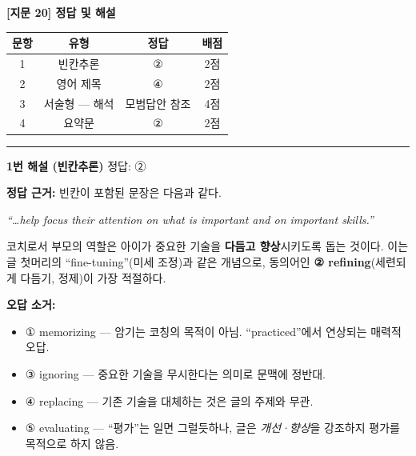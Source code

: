 \documentclass[11pt,a4paper]{article}
\begin{document}
\begin{center}
{\fontsize{15}{17}\selectfont\sffamily\bfseries [지문 20] 정답 및 해설}
\end{center}
\vspace{8pt}

\begin{center}
\begin{tabular}{|c|c|c|c|}
\hline
\textbf{문항} & \textbf{유형} & \textbf{정답} & \textbf{배점} \\
\hline
1 & 빈칸추론 & ② & 2점 \\
\hline
2 & 영어 제목 & ④ & 2점 \\
\hline
3 & 서술형 — 해석 & 모범답안 참조 & 4점 \\
\hline
4 & 요약문 & ② & 2점 \\
\hline
\end{tabular}
\end{center}

\vspace{12pt}
\hrule
\vspace{10pt}

{\sffamily\bfseries 1번 해설 (빈칸추론)} \hfill {\small 정답: ②}

\vspace{4pt}
\textbf{정답 근거:} 빈칸이 포함된 문장은 다음과 같다.

\begin{pbox}
\itshape
``\ldots help focus their attention on what is important and on \underline{\hspace{2.5cm}} important skills.''
\end{pbox}

\vspace{4pt}
코치로서 부모의 역할은 아이가 중요한 기술을 \textbf{다듬고 향상}시키도록 돕는 것이다.
이는 글 첫머리의 ``fine-tuning''(미세 조정)과 같은 개념으로, 동의어인 \textbf{② refining}(세련되게
다듬기, 정제)이 가장 적절하다.

\vspace{6pt}
\textbf{오답 소거:}
\begin{itemize}[leftmargin=2em,itemsep=1pt]
  \item ① memorizing — 암기는 코칭의 목적이 아님. ``practiced''에서 연상되는 매력적 오답.
  \item ③ ignoring — 중요한 기술을 무시한다는 의미로 문맥에 정반대.
  \item ④ replacing — 기존 기술을 대체하는 것은 글의 주제와 무관.
  \item ⑤ evaluating — ``평가''는 일면 그럴듯하나, 글은 \textit{개선·향상}을 강조하지 평가를
  목적으로 하지 않음.
\end{itemize}
\end{document}
